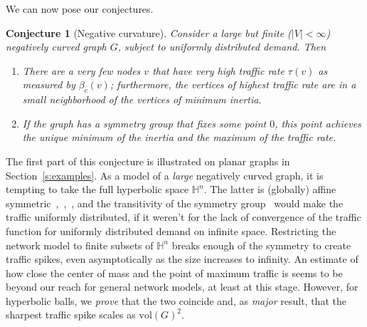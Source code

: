 \documentclass{article}
\newcommand{\vol}{\mathrm{vol}}
\newtheorem{conjecture}{Conjecture}
\begin{document}
We can now pose our conjectures.

\begin{conjecture}[Negative curvature]
Consider a large but finite ($|V|<\infty$) negatively curved graph $G$, subject to uniformly distributed demand. Then 
\begin{enumerate} 
\item There are a very few nodes $v$ that have very high traffic rate $\tau(v)$ 
as measured by $\beta_c(v)$;  
furthermore, the vertices of highest traffic rate are in a small neighborhood of the vertices of minimum inertia. 
\item If the graph has a symmetry group that fixes some point $0$, 
this point achieves the unique minimum of the inertia and the maximum of the traffic rate. 
\end{enumerate}
\end{conjecture}
\noindent
The first part of this conjecture is illustrated on planar graphs in 
Section~\ref{s:examples}.  
As a model of a {\it large} negatively curved graph, 
it is tempting to take the full hyperbolic space $\mathbb{H}^n$. 
The latter is (globally) affine symmetric~\cite[Chap. IV]{Helgason},~\cite[Sec. 6.2]{Jost1998},~\cite[Chap. XI, Example 10.2]{KobayashiNomizu1996b}, 
and the transitivity of the symmetry group~\cite[XI, Th. 1.4]{KobayashiNomizu1996b}
would make the traffic uniformly distributed,  
if it weren't for the lack of convergence of the traffic function for uniformly distributed demand on infinite space. 
Restricting the network model to finite subsets of $\mathbb{H}^n$ breaks enough of the symmetry 
to create traffic spikes, even asymptotically as the size increases to infinity.  
An estimate of how close the center of mass and the point of maximum traffic is seems to be beyond 
our reach for general network models, at least at this stage. 
However, for hyperbolic balls, we {\it prove} that the two coincide 
and, as {\it major} result, that the sharpest traffic spike scales as $\vol(G)^2$. 
\end{document}
